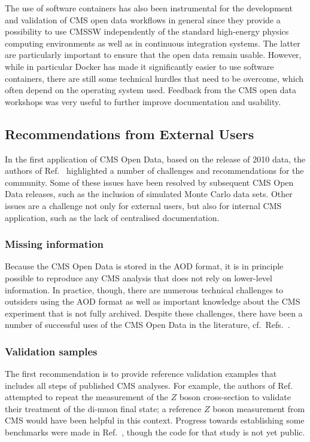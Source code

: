 \documentclass[10pt]{article}
\begin{document}
The use of software containers has also been instrumental for the development and validation of CMS open data workflows in general since they provide a possibility to use CMSSW independently of the standard high-energy physics computing environments as well as in continuous integration systems.
The latter are particularly important to ensure that the open data remain usable.
However, while in particular Docker has made it significantly easier to use software containers, there are still some technical hurdles that need to be overcome, which often depend on the operating system used.
Feedback from the CMS open data workshops was very useful to further improve documentation and usability.


\subsection{Recommendations from External Users}
\label{sec:cms:external}
%
In the first application of CMS Open Data, based on the release of 2010 data, the authors of Ref.~\cite{Tripathee:2017ybi} highlighted a number of challenges and recommendations for the community.
%
Some of these issues have been resolved by subsequent CMS Open Data releases, such as the inclusion of simulated Monte Carlo data sets.
%
Other issues are a challenge not only for external users, but also for internal CMS application, such as the lack of centralised documentation.

\subsubsection{Missing information}
%
Because the CMS Open Data is stored in the AOD format, it is in principle possible to reproduce any CMS analysis that does not rely on lower-level information.
%
In practice, though, there are numerous technical challenges to outsiders using the AOD format as well as important knowledge about the CMS experiment that is not fully archived.
%
Despite these challenges, there have been a number of successful uses of the CMS Open Data in the literature, cf.\ Refs.~\cite{Larkoski:2017bvj,Tripathee:2017ybi, Madrazo:2017qgh, Andrews:2018nwy, Bhaduri:2019dfa, Cesarotti:2019nax, Andrews:2019faz, Lester:2019bso, Facini:2019rgg, Apyan:2019ybx, Komiske:2019jim, Moreno:2019neq, Bhaduri:2019zkd, Felser:2020mka, Bhaduri:2020yfn, Pata:2021sud, Andrews:2021ejw}.

\subsubsection{Validation samples}
%
The first recommendation is to provide reference validation examples that includes all steps of published CMS analyses.
%
For example, the authors of Ref.~\cite{Cesarotti:2019nax} attempted to repeat the measurement of the $Z$ boson cross-section to validate their treatment of the di-muon final state; a reference $Z$ boson measurement from CMS would have been helpful in this context.
%
Progress towards establishing some benchmarks were made in Ref.~\cite{Apyan:2019ybx}, though the code for that study is not yet public.
\end{document}
